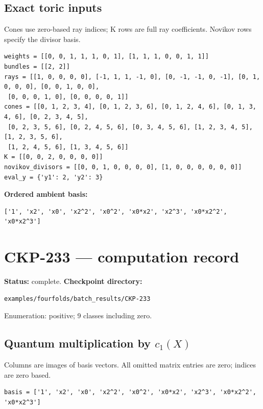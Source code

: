 \documentclass[10pt,a4paper]{article}
\begin{document}
\subsection*{Exact toric inputs}
Cones use zero-based ray indices; K rows are full ray coefficients. Novikov rows specify the divisor basis.

\begin{lstlisting}
weights = [[0, 0, 1, 1, 1, 0, 1], [1, 1, 1, 0, 0, 1, 1]]
bundles = [[2, 2]]
rays = [[1, 0, 0, 0, 0], [-1, 1, 1, -1, 0], [0, -1, -1, 0, -1], [0, 1, 0, 0, 0], [0, 0, 1, 0, 0],
 [0, 0, 0, 1, 0], [0, 0, 0, 0, 1]]
cones = [[0, 1, 2, 3, 4], [0, 1, 2, 3, 6], [0, 1, 2, 4, 6], [0, 1, 3, 4, 6], [0, 2, 3, 4, 5],
 [0, 2, 3, 5, 6], [0, 2, 4, 5, 6], [0, 3, 4, 5, 6], [1, 2, 3, 4, 5], [1, 2, 3, 5, 6],
 [1, 2, 4, 5, 6], [1, 3, 4, 5, 6]]
K = [[0, 0, 2, 0, 0, 0, 0]]
novikov_divisors = [[0, 0, 1, 0, 0, 0, 0], [1, 0, 0, 0, 0, 0, 0]]
eval_y = {'y1': 2, 'y2': 3}
\end{lstlisting}

\textbf{Ordered ambient basis:}
\begin{lstlisting}
['1', 'x2', 'x0', 'x2^2', 'x0^2', 'x0*x2', 'x2^3', 'x0*x2^2', 'x0*x2^3']
\end{lstlisting}

\clearpage\section*{CKP-233 --- computation record}
\textbf{Status:} complete.
\textbf{Checkpoint directory:}
\begin{lstlisting}
examples/fourfolds/batch_results/CKP-233
\end{lstlisting}

Enumeration: positive; 9 classes including zero.
\subsection*{Quantum multiplication by $c_1(X)$}
Columns are images of basis vectors. All omitted matrix entries are zero; indices are zero based.

\begin{lstlisting}
basis = ['1', 'x2', 'x0', 'x2^2', 'x0^2', 'x0*x2', 'x2^3', 'x0*x2^2', 'x0*x2^3']
\end{lstlisting}
\end{document}
